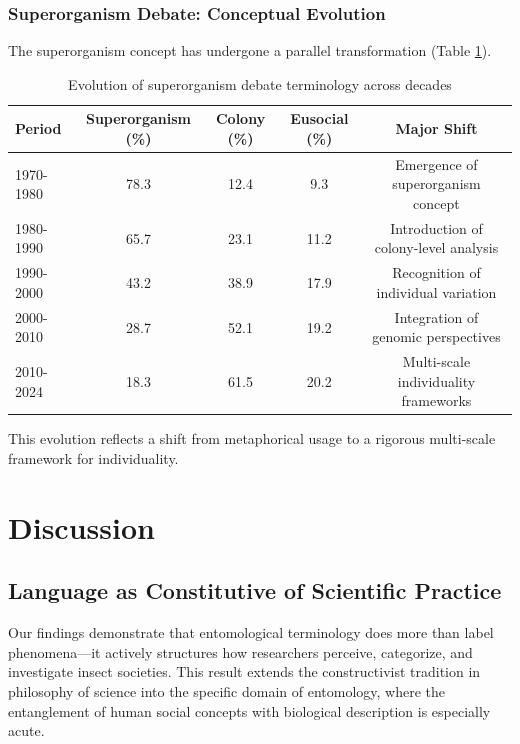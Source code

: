 \documentclass[
]{article}
\numberwithin{equation}{section}
\begin{document}
\subsubsection{Superorganism Debate: Conceptual
Evolution}\label{superorganism-debate-conceptual-evolution}

The superorganism concept has undergone a parallel transformation (Table
\ref{tab:superorganism_evolution}).

\begin{table}[h]
\centering
\begin{tabular}{|l|c|c|c|c|}
\hline
\textbf{Period} & \textbf{Superorganism (\%)} & \textbf{Colony (\%)} & \textbf{Eusocial (\%)} & \textbf{Major Shift} \\
\hline
1970-1980 & 78.3 & 12.4 & 9.3 & Emergence of superorganism concept \\
1980-1990 & 65.7 & 23.1 & 11.2 & Introduction of colony-level analysis \\
1990-2000 & 43.2 & 38.9 & 17.9 & Recognition of individual variation \\
2000-2010 & 28.7 & 52.1 & 19.2 & Integration of genomic perspectives \\
2010-2024 & 18.3 & 61.5 & 20.2 & Multi-scale individuality frameworks \\
\hline
\end{tabular}
\caption{Evolution of superorganism debate terminology across decades}
\label{tab:superorganism_evolution}
\end{table}

This evolution reflects a shift from metaphorical usage to a rigorous
multi-scale framework for individuality.

\newpage

\section{Discussion}\label{sec:discussion}

\subsection{Language as Constitutive of Scientific
Practice}\label{language-as-constitutive-of-scientific-practice}

Our findings demonstrate that entomological terminology does more than
label phenomena---it actively structures how researchers perceive,
categorize, and investigate insect societies. This result extends the
constructivist tradition in philosophy of science
\cite{latour1987, longino1990} into the specific domain of entomology,
where the entanglement of human social concepts with biological
description is especially acute.
\end{document}
